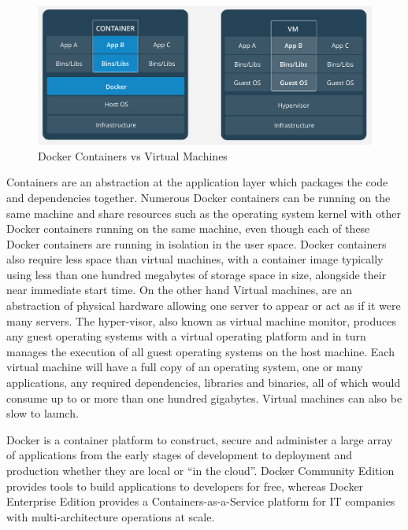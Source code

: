 \begin{figure}
\includegraphics[width=\textwidth]{img/containervvm.PNG}
\caption{Docker Containers vs Virtual Machines}
\label{fig:containervsvm}
\end{figure}

Containers are an abstraction at the application layer which packages the code and dependencies  together. Numerous Docker containers can be running on the same machine and share resources such as the operating system kernel with other Docker containers running on the same machine, even though each of these Docker containers are running in isolation in the user space. Docker containers also require less space than virtual machines, with a container image typically using less than one hundred megabytes of storage space in size, alongside their near immediate start time.
On the other hand Virtual machines, are an abstraction of physical hardware allowing one server to appear or act as if it were many servers. The hyper-visor, also known as virtual machine monitor, produces any guest operating systems with a virtual operating platform and in turn manages the execution of all guest operating systems on the host machine. Each virtual machine will have a full copy of an operating system, one or many applications, any required dependencies, libraries and binaries, all of which would consume up to or more than one hundred gigabytes. Virtual machines can also be slow to launch. 

Docker is a container platform to construct, secure and administer a large array of applications from the early stages of development to deployment and production whether they are local or “in the cloud”. Docker Community Edition provides tools to build applications to developers for free, whereas Docker Enterprise Edition provides a Containers-as-a-Service platform for IT companies with multi-architecture operations at scale. 

